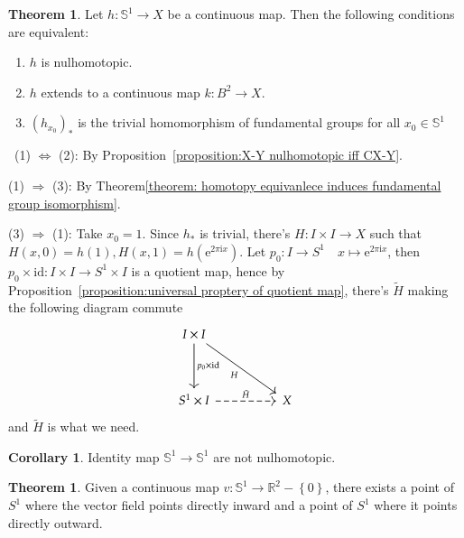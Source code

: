 \documentclass[12pt,a4paper]{book}
\newenvironment{prooff}{{\noindent\it\textcolor{cyan!40!black}{Proof}:}\,}{\par}
\newcommand{\bbrace}[1]{\left\{ #1 \right\} }
\newcommand{\bb}[1]{\mathbb{#1}}
\theoremstyle{definition}
\newtheorem{coro}[defn]{Corollary}
\newtheorem{theo}[defn]{Theorem}
\begin{document}
\begin{theo}
    Let $h: \bb{S}^1 \rightarrow X$ be a continuous map. 
    Then the following conditions are equivalent:
    \begin{enumerate}[(1)]
        \item $h$ is nulhomotopic.
        \item $h$ extends to a continuous map $k: B^2 \rightarrow X$.
        \item $(h_{x_0})_*$ is the trivial homomorphism of fundamental groups for all $x_0\in \bb{S}^1$
    \end{enumerate}
\end{theo}
\begin{prooff}
    (1) $\Leftrightarrow$ (2): By Proposition~\ref{proposition:X-Y nulhomotopic iff CX-Y}.

    (1) $\Rightarrow$ (3): By Theorem\ref{theorem: homotopy equivanlece induces fundamental group isomorphism}. 

    (3) $\Rightarrow$ (1): Take $x_0=1$.
    Since $h_*$ is trivial, there's $H:I\times I\rightarrow X$ such that $H(x,0)=h(1), H(x,1)=h(\text{e}^{2\pi \text{i}x})$.
    Let $p_0:I\rightarrow S^1 \quad x\mapsto \text{e}^{2\pi \text{i}x}$, then $p_0\times \text{id}:I\times I\rightarrow S^1 \times I$ is a quotient map,
    hence by Proposition~\ref{proposition:universal proptery of quotient map}, there's $\tilde{H}$ making the following diagram commute
    \[\begin{tikzcd}
            {I\times I} \\
            \\
            {S^1\times I} && X
            \arrow["{p_0\times \text{id}}", from=1-1, to=3-1]
            \arrow["H"', from=1-1, to=3-3]
            \arrow["{\tilde{H}}", dashed, from=3-1, to=3-3]
        \end{tikzcd}\]
    and $\tilde{H}$ is what we need.
\end{prooff}
\begin{coro}
    Identity map $\bb{S}^1\rightarrow \bb{S}^1$ are not nulhomotopic.
\end{coro}
\begin{theo}
    Given a continuous map $v:\bb{S}^1\rightarrow \bb{R}^2-\bbrace{0}$, there exists a point of $S^1$ where the vector field points directly inward and a point of $S^1$ where it points directly outward.
\end{theo}
\end{document}
